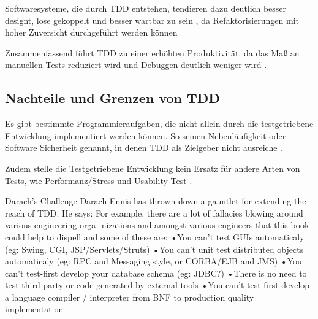   Softwaresysteme, die durch TDD entstehen, tendieren dazu deutlich besser designt, lose gekoppelt und besser wartbar zu sein \citep{beck_test_2002} \citep{palermo_guidelines_2006}, da Refaktorisierungen mit hoher Zuversicht durchgeführt werden können
  
  Zusammenfassend führt TDD zu einer erhöhten Produktivität, da das Maß an manuellen Tests reduziert wird und Debuggen deutlich weniger wird \citep{palermo_guidelines_2006}.
  
  \subsection{Nachteile und Grenzen von TDD}
  Es gibt bestimmte Programmieraufgaben, die nicht allein durch die testgetriebene Entwicklung implementiert werden können. So seinen Nebenläufigkeit oder Software Sicherheit genannt, in denen TDD als Zielgeber nicht ausreiche \citep[S. xii]{beck_test_2002}.
  
  Zudem stelle die Testgetriebene Entwicklung kein Ersatz für andere Arten von Tests, wie Performanz/Stress und Usability-Test \citep[S. 86]{beck_test_2002}.
    
    Darach’s Challenge
Darach Ennis has thrown down a gauntlet for extending the reach of TDD. He says:
For example, there are a lot of fallacies blowing around various engineering orga-
nizations and amongst various engineers that this book could help to dispell and
some of these are:
•You can’t test GUIs automaticaly (eg: Swing, CGI, JSP/Servlets/Struts)
•You can’t unit test distributed objects automaticaly (eg: RPC and Messaging
style, or CORBA/EJB and JMS)
•You can’t test-first develop your database schema (eg: JDBC?)
•There is no need to test third party or code generated by external tools
•You can’t test first develop a language compiler / interpreter from BNF to
production quality implementation
